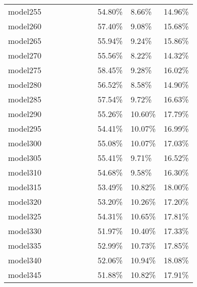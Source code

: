 \begin{longtable}{@{}llllllllll@{}}
model255 &         &         &         &          &         &         & 54.80\%  & 8.66\%  & 14.96\% \\
model260 &         &         &         &          &         &         & 57.40\%  & 9.08\%  & 15.68\% \\
model265 &         &         &         &          &         &         & 55.94\%  & 9.24\%  & 15.86\% \\
model270 &         &         &         &          &         &         & 55.56\%  & 8.22\%  & 14.32\% \\
model275 &         &         &         &          &         &         & 58.45\%  & 9.28\%  & 16.02\% \\
model280 &         &         &         &          &         &         & 56.52\%  & 8.58\%  & 14.90\% \\
model285 &         &         &         &          &         &         & 57.54\%  & 9.72\%  & 16.63\% \\
model290 &         &         &         &          &         &         & 55.26\%  & 10.60\% & 17.79\% \\
model295 &         &         &         &          &         &         & 54.41\%  & 10.07\% & 16.99\% \\
model300 &         &         &         &          &         &         & 55.08\%  & 10.07\% & 17.03\% \\
model305 &         &         &         &          &         &         & 55.41\%  & 9.71\%  & 16.52\% \\
model310 &         &         &         &          &         &         & 54.68\%  & 9.58\%  & 16.30\% \\
model315 &         &         &         &          &         &         & 53.49\%  & 10.82\% & 18.00\% \\
model320 &         &         &         &          &         &         & 53.20\%  & 10.26\% & 17.20\% \\
model325 &         &         &         &          &         &         & 54.31\%  & 10.65\% & 17.81\% \\
model330 &         &         &         &          &         &         & 51.97\%  & 10.40\% & 17.33\% \\
model335 &         &         &         &          &         &         & 52.99\%  & 10.73\% & 17.85\% \\
model340 &         &         &         &          &         &         & 52.06\%  & 10.94\% & 18.08\% \\
model345 &         &         &         &          &         &         & 51.88\%  & 10.82\% & 17.91\% \\

\end{longtable}
